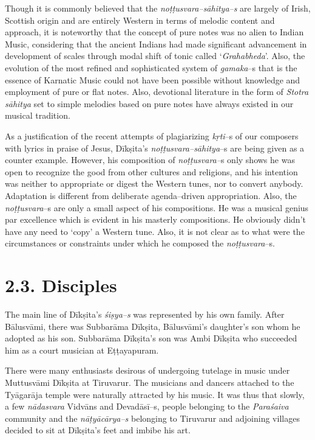 Though it is commonly believed that the \textit{noṭṭusvara–sāhitya–s} are largely of Irish, Scottish origin and are entirely Western in terms of melodic content and approach, it is noteworthy that the concept of pure notes was no alien to Indian Music, considering that the ancient Indians had made significant advancement in development of scales through modal shift of tonic called ‘\textit{Grahabheda}’. Also, the evolution of the most refined and sophisticated system of \textit{gamaka}–s that is the essence of Karnatic Music could not have been possible without knowledge and employment of pure or flat notes. Also, devotional literature in the form of \textit{Stotra sāhitya} set to simple melodies based on pure notes have always existed in our musical tradition.

As a justification of the recent attempts of plagiarizing \textit{kṛti}–s of our composers with lyrics in praise of Jesus, Dīkṣita’s \textit{noṭṭusvara–sāhitya}–s are being given as a counter example. However, his composition of \textit{noṭṭusvara–}s only shows he was open to recognize the good from other cultures and religions, and his intention was neither to appropriate or digest the Western tunes, nor to convert anybody. Adaptation is different from deliberate agenda–driven appropriation. Also, the \textit{noṭṭusvara}–s are only a small aspect of his compositions. He was a musical genius par excellence which is evident in his masterly compositions. He obviously didn’t have any need to ‘copy’ a Western tune. Also, it is not clear as to what were the circumstances or constraints under which he composed the \textit{noṭṭusvara}–s.



\section*{2.3. Disciples}

The main line of Dīkṣita’s \textit{śiṣya–s} was represented by his own family. After Bālusvāmi, there was Subbarāma Dīkṣita, Bālusvāmi’s daughter’s son whom he adopted as his son. Subbarāma Dīkṣita’s son was Ambi Dīkṣita who succeeded him as a court musician at Eṭṭayapuram.

There were many enthusiasts desirous of undergoing tutelage in music under Muttusvāmi Dīkṣita at Tiruvarur. The musicians and dancers attached to the Tyāgarāja temple were naturally attracted by his music. It was thus that slowly, a few \textit{nādasvara} Vidvāns and Devadāsī–s, people belonging to the \textit{Paraśaiva} community and the \textit{nāṭyācārya–s} belonging to Tiruvarur and adjoining villages decided to sit at Dīkṣita's feet and imbibe his art.

